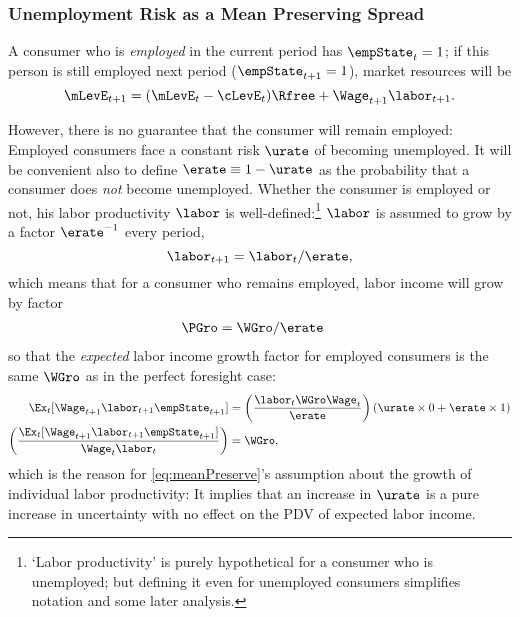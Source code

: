 \subsubsection{Unemployment Risk as a Mean Preserving Spread} \label{subsubsec:uMPS}
A consumer who is {\it employed} in the current
period has $\empState_{t}=1$; if this person is still employed next
period ($\empState_{t+1}=1$), market resources will be
\begin{equation}
\mLevE_{t+1} = (\mLevE_{t}-\cLevE_{t})\Rfree+\Wage_{t+1}\labor_{t+1}. \label{eq:Metp1}
\end{equation}

However, there is no guarantee that the consumer will remain employed: Employed consumers face a constant risk $\urate$ of becoming unemployed.  %
It will be convenient also to define $\erate\equiv 1-\urate$ as the probability that a consumer does {\it not} become unemployed.  Whether the consumer is employed or not, his labor productivity $\labor$ is well-defined:\footnote{`Labor productivity' is purely hypothetical for a consumer who is unemployed; but defining it even for unemployed consumers simplifies notation and some later analysis.}  $\labor$ is assumed to grow by a factor $\erate^{-1}$ every period,
\begin{equation}
\labor_{t+1} =    \labor_{t}/\erate \label{eq:meanPreserve},
\end{equation}
which means that for a consumer who remains employed, labor income will grow by factor
\begin{equation}\begin{gathered}\begin{aligned}
  \PGro & =  \WGro/\erate
\end{aligned}\end{gathered}\end{equation}
so that the {\it expected} labor income growth factor for
employed consumers is the same $\WGro$ as in the perfect foresight case:
\begin{equation*}\begin{gathered}\begin{aligned}
  \Ex_{t}[\Wage_{t+1}\labor_{t+1}\empState_{t+1}] & =   \left(\frac{\labor_{t} \WGro \Wage_{t}}{\erate}\right)\left(\urate \times 0 + \erate \times 1 \right)
\\ \left(\frac{\Ex_{t}[\Wage_{t+1}\labor_{t+1}\empState_{t+1}]}{\Wage_{t} \labor_{t}}\right) &  =  \WGro
,
\end{aligned}\end{gathered}\end{equation*}
which is  the reason for \eqref{eq:meanPreserve}'s assumption about the growth of
individual labor productivity: It implies
that an increase in $\urate$ is a pure increase in uncertainty with no
effect on the PDV of expected labor income.

